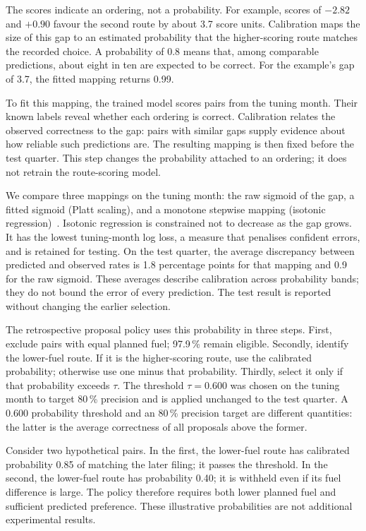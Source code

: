 \documentclass[conference,10pt,a4paper,IEEEoverridecommandlockouts]{IEEEtran}
\begin{document}
The scores indicate an ordering, not a probability. For example, scores
of $-2.82$ and $+0.90$ favour the second route by about 3.7 score units.
Calibration maps the size of this gap to an estimated probability that
the higher-scoring route matches the recorded choice. A probability of
0.8 means that, among comparable predictions, about eight in ten are
expected to be correct. For the example's gap of 3.7, the fitted mapping
returns 0.99.

To fit this mapping, the trained model scores pairs from the tuning
month. Their known labels reveal whether each ordering is correct.
Calibration relates the observed correctness to the gap: pairs with
similar gaps supply evidence about how reliable such predictions are.
The resulting mapping is then fixed before the test quarter. This step
changes the probability attached to an ordering; it does not retrain
the route-scoring model.

We compare three mappings on the tuning month: the raw sigmoid of the
gap, a fitted sigmoid (Platt scaling), and a monotone stepwise mapping
(isotonic regression)~\cite{zadrozny2002,guo2017}. Isotonic regression
is constrained not to decrease as the gap grows. It has the lowest
tuning-month log loss, a measure that penalises confident errors, and
is retained for testing.
On the test quarter, the average discrepancy between predicted and
observed rates is 1.8 percentage points for that mapping and 0.9 for
the raw sigmoid. These averages describe calibration across probability
bands; they do not bound the error of every prediction. The test result
is reported without changing the earlier selection.

The retrospective proposal policy uses this probability in three steps.
First, exclude pairs with equal planned fuel; 97.9\,\% remain eligible.
Secondly, identify the lower-fuel route. If it is the higher-scoring
route, use the calibrated probability; otherwise use one minus that probability.
Thirdly, select it only if that probability exceeds $\tau$. The threshold
$\tau=0.600$ was chosen on the tuning month to target 80\,\% precision
and is applied unchanged to the test quarter. A 0.600 probability
threshold and an 80\,\% precision target are different quantities:
the latter is the average correctness of all proposals above the former.

Consider two hypothetical pairs. In the first, the lower-fuel route
has calibrated probability 0.85 of matching the later filing; it passes
the threshold. In the second, the lower-fuel route has probability 0.40;
it is withheld even if its fuel difference is large. The policy therefore
requires both lower planned fuel and sufficient predicted preference.
These illustrative probabilities are not additional experimental results.
\end{document}
